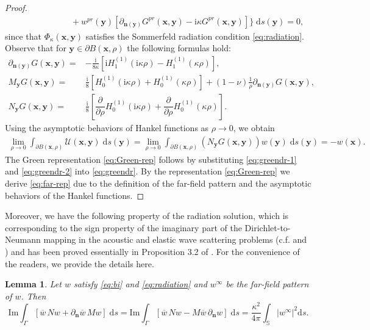 \documentclass[10pt,a4paper]{article}
\numberwithin{equation}{section}
\newtheorem{lemma}[theorem]{Lemma}
\begin{document}
\begin{proof}
\begin{align}
  &\qquad \qquad \qquad  + w^{pr}(\bm{ y }) \left[\partial_{\bm{n}(\bm{ y }) }G^{pr}(\bm{ x }, \bm{ y }) -\mathrm{ i } \kappa G^{pr}(\bm{ x }, \bm{ y })   \right]
    \Big\} \;\mathrm{d}s(\bm{ y }) =0,
\label{eq:greendr-1}
\end{align}
since that $\Phi_{\kappa}(\bm{ x }, \bm{ y })$ satisfies the Sommerfeld radiation condition \eqref{eq:radiation}.
Observe that for $\bm{ y }\in \partial B(\bm{ x },\rho)$ the following formulas hold:
  \begin{align*}
  \partial_{\bm{n}(\bm{ y })} G(\bm{ x },\bm{ y })  = & -\frac{\mathrm{ i } }{8 \kappa} [\mathrm{ i } H^{(1)}_1(\mathrm{ i } \kappa \rho) -  H^{(1)}_1(\kappa \rho)], \\
   M_{\bm{ y }} G(\bm{ x },\bm{ y }) = & \frac{\mathrm{ i } }{8} [H^{(1)}_0(\mathrm{ i } \kappa \rho) +  H^{(1)}_0(\kappa \rho)] + (1-\nu) \frac{1}{\rho} \partial_{\bm{n}(\bm{ y })} G(\bm{ x },\bm{ y }),  \\
    N_{\bm{ y }} G(\bm{ x },\bm{ y }) = & \frac{\mathrm{ i } }{8} [  \dfrac{\partial }{\partial \rho} H^{(1)}_0(\mathrm{ i } \kappa \rho)+\dfrac{\partial }{\partial \rho} H^{(1)}_0(\kappa \rho)] . 
  \end{align*}
  Using the asymptotic behaviors of Hankel functions as $\rho\to 0$, we obtain
  \begin{align}
    \label{eq:greendr-2}
    \lim\limits_{\rho\to 0} \int_{\partial B(\bm{ x },\rho) }  \mathcal{U}(\bm{ x },\bm{ y })
      \;\mathrm{d}s(\bm{ y })
    = \lim\limits_{\rho\to 0} \int_{\partial B(\bm{ x},\rho) } (N_{\bm{ y }}G(\bm{ x }, \bm{ y }) ) w(\bm{ y })  \;\mathrm{d}s(\bm{ y }) = -w(\bm{ x }).
  \end{align}
The Green representation \eqref{eq:Green-rep} follows by substituting \eqref{eq:greendr-1} and \eqref{eq:greendr-2} into \eqref{eq:greendr}. By the representation \eqref{eq:Green-rep} we derive \eqref{eq:far-rep} due to the definition of the far-field pattern and the asymptotic behaviors of the Hankel functions.
 \end{proof}
Moreover, we have the following property of the radiation solution, which is corresponding to the sign property of the imaginary part of the Dirichlet-to-Neumann mapping in the acoustic and elastic wave scattering problems (c.f. \cite[Lemma 3.3]{chen_reverse_2013} and \cite[Lemma 3.5]{chen_reverse_2015})  and has been proved essentially in Proposition 3.2 of \cite{bourgeois_well_2020}. For the convenience of the readers, we provide the details here.
\begin{lemma}
  \label{lem:sign}
  Let $w$ satisfy \eqref{eq:bi} and \eqref{eq:radiation} and $w^{\infty}$ be the far-field pattern of $w$. Then
  \begin{equation*}
    \mathrm{Im} \int_{\Gamma}[\overline{w}\, N w +  \partial_{\bm{n}}\overline{w}\, M w] \;\mathrm{d}s
    =   \mathrm{Im} \int_{\Gamma}[\overline{w}\, N w -M  \overline{w}\,  \partial_{\bm{n}}w] \;\mathrm{d}s
    = \frac{\kappa^{2}}{4\pi}\int_{\mathbb{S}}|w^{\infty}|^{2}\mathrm{d}s.
  \end{equation*}
\end{lemma}
\end{document}
